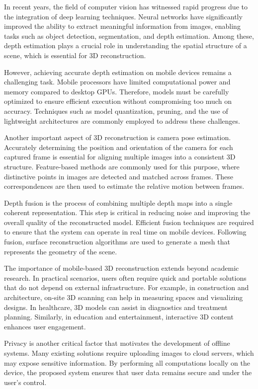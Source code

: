 In recent years, the field of computer vision has witnessed rapid progress due to the integration of deep learning techniques. Neural networks have significantly improved the ability to extract meaningful information from images, enabling tasks such as object detection, segmentation, and depth estimation. Among these, depth estimation plays a crucial role in understanding the spatial structure of a scene, which is essential for 3D reconstruction.

However, achieving accurate depth estimation on mobile devices remains a challenging task. Mobile processors have limited computational power and memory compared to desktop GPUs. Therefore, models must be carefully optimized to ensure efficient execution without compromising too much on accuracy. Techniques such as model quantization, pruning, and the use of lightweight architectures are commonly employed to address these challenges.

Another important aspect of 3D reconstruction is camera pose estimation. Accurately determining the position and orientation of the camera for each captured frame is essential for aligning multiple images into a consistent 3D structure. Feature-based methods are commonly used for this purpose, where distinctive points in images are detected and matched across frames. These correspondences are then used to estimate the relative motion between frames.

Depth fusion is the process of combining multiple depth maps into a single coherent representation. This step is critical in reducing noise and improving the overall quality of the reconstructed model. Efficient fusion techniques are required to ensure that the system can operate in real time on mobile devices. Following fusion, surface reconstruction algorithms are used to generate a mesh that represents the geometry of the scene.

The importance of mobile-based 3D reconstruction extends beyond academic research. In practical scenarios, users often require quick and portable solutions that do not depend on external infrastructure. For example, in construction and architecture, on-site 3D scanning can help in measuring spaces and visualizing designs. In healthcare, 3D models can assist in diagnostics and treatment planning. Similarly, in education and entertainment, interactive 3D content enhances user engagement.

Privacy is another critical factor that motivates the development of offline systems. Many existing solutions require uploading images to cloud servers, which may expose sensitive information. By performing all computations locally on the device, the proposed system ensures that user data remains secure and under the user's control.

